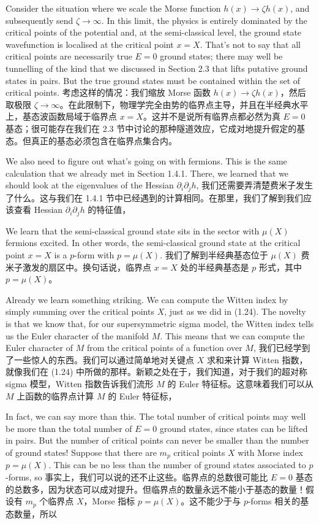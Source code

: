 \documentclass{article}
\begin{document}
\begin{paracol}{2}
Consider the situation where we scale the Morse function $h(x) \to \zeta h(x)$, and subsequently send $\zeta \to \infty$. In this limit, the physics is entirely dominated by the critical points of the potential and, at the semi-classical level, the ground state wavefunction is localised at the critical point $x = X$. That’s not to say that all critical points are necessarily true $E = 0$ ground states; there may well be tunnelling of the kind that we discussed in Section 2.3 that lifts putative ground states in pairs. But the true ground states must be contained within the set of critical points.
\switchcolumn
考虑这样的情况：我们缩放 Morse 函数 $h(x) \to \zeta h(x)$，然后取极限 $\zeta \to \infty$。在此限制下，物理学完全由势的临界点主导，并且在半经典水平上，基态波函数局域于临界点 $x = X$。这并不是说所有临界点都必然为真 $E = 0$ 基态；很可能存在我们在 2.3 节中讨论的那种隧道效应，它成对地提升假定的基态。但真正的基态必须包含在临界点集合内。
\switchcolumn*

We also need to ﬁgure out what’s going on with fermions. This is the same calculation that we already met in Section 1.4.1. There, we learned that we should look at the eigenvalues of the Hessian $\partial_i \partial_j h$,
\switchcolumn
我们还需要弄清楚费米子发生了什么。这与我们在 1.4.1 节中已经遇到的计算相同。在那里，我们了解到我们应该查看 Hessian $\partial_i \partial_j h$ 的特征值，
\switchcolumn*

We learn that the semi-classical ground state sits in the sector with $\mu(X)$ fermions excited. In other words, the semi-classical ground state at the critical point $x = X$ is a $p$-form with $p = \mu(X)$.
\switchcolumn
我们了解到半经典基态位于 $\mu(X)$ 费米子激发的扇区中。换句话说，临界点 $x = X$ 处的半经典基态是 $p$ 形式，其中 $p = \mu(X)$。
\switchcolumn*

Already we learn something striking. We can compute the Witten index by simply summing over the critical points $X$, just as we did in (1.24). The novelty is that we know that, for our supersymmetric sigma model, the Witten index tells us the Euler character of the manifold $M$. This means that we can compute the Euler character of $M$ from the critical points of a function over $M$,
\switchcolumn
我们已经学到了一些惊人的东西。我们可以通过简单地对关键点 $X$ 求和来计算 Witten 指数，就像我们在 (1.24) 中所做的那样。新颖之处在于，我们知道，对于我们的超对称 sigma 模型，Witten 指数告诉我们流形 $M$ 的 Euler 特征标。这意味着我们可以从 $M$ 上函数的临界点计算 $M$ 的 Euler 特征标，
\switchcolumn*

In fact, we can say more than this. The total number of critical points may well be more than the total number of $E = 0$ ground states, since states can be lifted in pairs. But the number of critical points can never be smaller than the number of ground states! Suppose that there are $m_p$ critical points $X$ with Morse index $p = \mu(X)$. This can be no less than the number of ground states associated to $p$-forms, so
\switchcolumn
事实上，我们可以说的还不止这些。临界点的总数很可能比 $E = 0$ 基态的总数多，因为状态可以成对提升。但临界点的数量永远不能小于基态的数量！假设有 $m_p$ 个临界点 $X$，Morse 指标 $p = \mu(X)$。这不能少于与 $p$-forms 相关的基态数量，所以
\switchcolumn*


\end{paracol}
\end{document}
